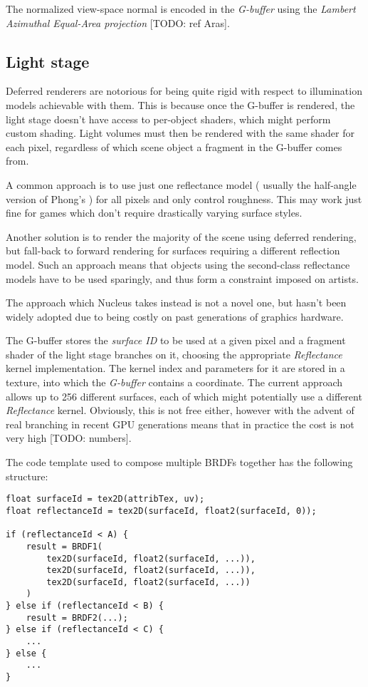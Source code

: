 The normalized view-space normal is encoded in the \emph{G-buffer} using the \emph{Lambert Azimuthal Equal-Area projection} [TODO: ref Aras].

\subsection{Light stage}

Deferred renderers are notorious for being quite rigid with respect to illumination models achievable with them. This is because once the G-buffer is rendered, the light stage doesn't have access to per-object shaders, which might perform custom shading. Light volumes must then be rendered with the same shader for each pixel, regardless of which scene object a fragment in the G-buffer comes from.

A common approach is to use just one reflectance model ( usually the half-angle version of Phong's ) for all pixels and only control roughness. This may work just fine for games which don't require drastically varying surface styles.

Another solution is to render the majority of the scene using deferred rendering, but fall-back to forward rendering for surfaces requiring a different reflection model. Such an approach means that objects using the second-class reflectance models have to be used sparingly, and thus form a constraint imposed on artists.

The approach which Nucleus takes instead is not a novel one, but hasn't been widely adopted due to being costly on past generations of graphics hardware.

The G-buffer stores the \emph{surface ID} to be used at a given pixel and a fragment shader of the light stage branches on it, choosing the appropriate \emph{Reflectance} kernel implementation. The kernel index and parameters for it are stored in a texture, into which the \emph{G-buffer} contains a coordinate. The current approach allows up to 256 different surfaces, each of which might potentially use a different \emph{Reflectance} kernel. Obviously, this is not free either, however with the advent of real branching in recent GPU generations means that in practice the cost is not very high [TODO: numbers].

The code template used to compose multiple BRDFs together has the following structure:

\begin{lstlisting}[frame=single]
float surfaceId = tex2D(attribTex, uv);
float reflectanceId = tex2D(surfaceId, float2(surfaceId, 0));
 
if (reflectanceId < A) {
    result = BRDF1(
        tex2D(surfaceId, float2(surfaceId, ...)),
        tex2D(surfaceId, float2(surfaceId, ...)),
        tex2D(surfaceId, float2(surfaceId, ...))
    )
} else if (reflectanceId < B) {
    result = BRDF2(...);
} else if (reflectanceId < C) {
    ...
} else {
    ...
}
\end{lstlisting}

